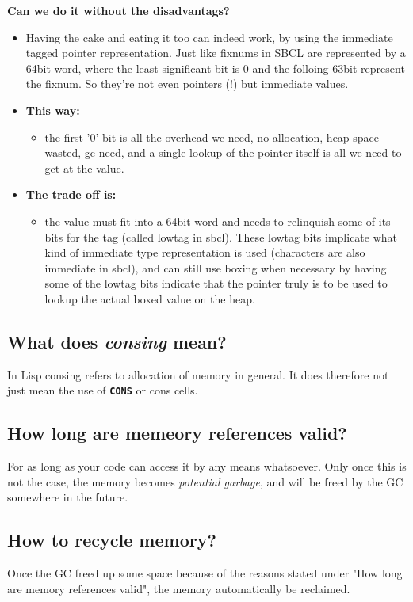 \documentclass[11pt]{article}
\begin{document}
\textbf{Can we do it without the disadvantags?}
\begin{itemize}
\item Having the cake and eating it too can indeed work, by using the immediate tagged
pointer representation. Just like fixnums in SBCL are represented by a 64bit word,
where the least significant bit is 0 and the folloing 63bit represent the fixnum.
So they're not even pointers (!) but immediate values.

\item \textbf{This way:} 
\begin{itemize}
\item the first '0' bit is all the overhead we need, no allocation, heap space wasted,
gc need, and a single lookup of the pointer itself is all we need to get at the
value.
\end{itemize}

\item \textbf{The trade off is:} 
\begin{itemize}
\item the value must fit into a 64bit word and needs to relinquish some of its bits for
the tag (called lowtag in sbcl). These lowtag bits implicate what kind of
immediate type representation is used (characters are also immediate in sbcl), and
can still use boxing when necessary by having some of the lowtag bits indicate
that the pointer truly is to be used to lookup the actual boxed value on the heap.
\end{itemize}
\end{itemize}


\subsection{What does \emph{consing} mean?}
\label{sec:orgd115c89}
In Lisp consing refers to allocation of memory in general. It does therefore not just
mean the use of \textbf{\texttt{CONS}} or cons cells.

\subsection{How long are memeory references valid?}
\label{sec:org217422e}
For as long as your code can access it by any means whatsoever. Only once this is not
the case, the memory becomes \emph{potential garbage}, and will be freed by the GC somewhere
in the future.

\subsection{How to recycle memory?}
\label{sec:org8035e3d}
Once the GC freed up some space because of the reasons stated under "How long are
memory references valid", the memory automatically be reclaimed.
\end{document}
